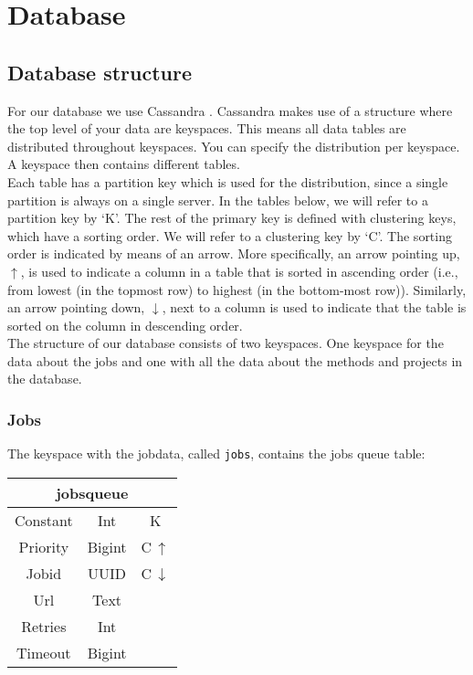 \documentclass[../Main.tex]{subfiles}
\begin{document}
\newpage
\section{Database}
\subsection{Database structure}
For our database we use Cassandra \cite{cassandra}. Cassandra makes use of a structure where the top level of your data are keyspaces. This means all data tables are distributed throughout keyspaces. You can specify the distribution per keyspace. A keyspace then contains different tables. \\

Each table has a partition key which is used for the distribution, since a single partition is always on a single server. In the tables below, we will refer to a partition key by ‘K'. The rest of the primary key is defined with clustering keys, which have a sorting order. We will refer to a clustering key by ‘C'. The sorting order is indicated by means of an arrow. More specifically, an arrow pointing up, $\uparrow$, is used to indicate a column in a table that is sorted in ascending order (i.e., from lowest (in the topmost row) to highest (in the bottom-most row)). Similarly, an arrow pointing down, $\downarrow$, next to a column is used to indicate that the table is sorted on the column in descending order.\\

The structure of our database consists of two keyspaces. One keyspace for the data about the jobs and one with all the data about the methods and projects in the database. 

\subsubsection{Jobs}
The keyspace with the jobdata, called \texttt{jobs}, contains the jobs queue table:

\begin{table}[h]
    \centering
    \begin{tabular}{|ccc|}
\hline
    \multicolumn{3}{|c|}{\textbf{jobsqueue}}   \\
    \hline
    Constant & Int & K \\
    Priority & Bigint & C\,$\uparrow$ \\
    Jobid & UUID & C\,$\downarrow$ \\
    Url & Text & \\
    Retries & Int & \\
    Timeout & Bigint & \\
    \hline
\end{tabular}
\end{table}
\end{document}

